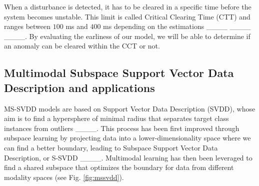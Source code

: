 When a disturbance is detected, it has to be cleared in a specific time before the system becomes unstable. This limit is called Critical Clearing Time (CTT) and ranges between $100$ ms and $400$ ms depending on the estimations ____ ____ ____. By evaluating the earliness of our model, we will be able to determine if an anomaly can be cleared within the CCT or not. 

\subsection{Multimodal Subspace Support Vector Data Description and applications}

MS-SVDD models are based on Support Vector Data Description (SVDD), whose aim is to find a hypersphere of minimal radius that separates target class instances from outliers ____. This process has been first improved through subspace learning by projecting data into a lower-dimensionality space where we can find a better boundary, leading to Subspace Support Vector Data Description, or S-SVDD ____. Multimodal learning has then been leveraged to find a shared subspace that optimizes the boundary for data from different modality spaces (see Fig. \ref{fig:mssvdd}). 


